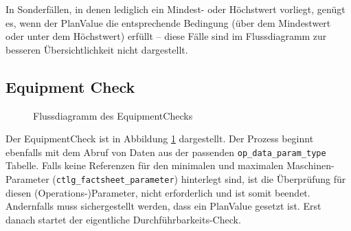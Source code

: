 In Sonderfällen, in denen lediglich ein Mindest- oder Höchstwert vorliegt, genügt es, wenn der PlanValue die entsprechende Bedingung (über dem Mindestwert oder unter dem Höchstwert) erfüllt – diese Fälle sind im Flussdiagramm zur besseren Übersichtlichkeit nicht dargestellt.


\subsection{Equipment Check}

\begin{figure}[!htbp]
    \centering
    \caption{Flussdiagramm des \gls{EquipmentCheck}s}
    \label{fig:equipment-check}
\end{figure}

Der \gls{EquipmentCheck} ist in Abbildung \ref{fig:equipment-check} dargestellt. Der Prozess beginnt ebenfalls mit dem Abruf von Daten aus der passenden \texttt{op\_data\_param\_type} Tabelle. Falls keine Referenzen für den minimalen und maximalen Maschinen-Parameter (\texttt{ctlg\_\-factsheet\_\-parameter}) hinterlegt sind, ist die Überprüfung für diesen (Operations-)\linebreak Parameter, nicht erforderlich und ist somit beendet. Andernfalls muss sichergestellt werden, dass ein PlanValue gesetzt ist. Erst danach startet der eigentliche Durchführ\-barkeits-Check.

